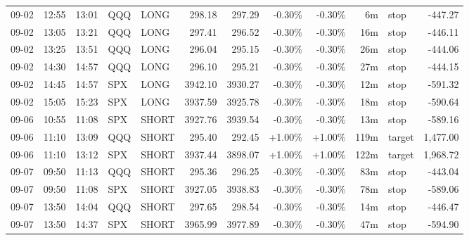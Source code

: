 \documentclass[11pt,a4paper,twoside]{article}
\begin{document}
\begin{center}
\begin{longtable}{>{\color{txtmain}}l l l l l r r r r r >{\color{txtmain}}l r}
09-02 & 12:55 & 13:01 & QQQ & LONG & 298.18 & 297.29 & \textcolor{lossred}{-0.30\%} & \textcolor{lossred}{-0.30\%} & 6m & stop & \textcolor{lossred}{-447.27} \\
09-02 & 13:05 & 13:21 & QQQ & LONG & 297.41 & 296.52 & \textcolor{lossred}{-0.30\%} & \textcolor{lossred}{-0.30\%} & 16m & stop & \textcolor{lossred}{-446.11} \\
09-02 & 13:25 & 13:51 & QQQ & LONG & 296.04 & 295.15 & \textcolor{lossred}{-0.30\%} & \textcolor{lossred}{-0.30\%} & 26m & stop & \textcolor{lossred}{-444.06} \\
09-02 & 14:30 & 14:57 & QQQ & LONG & 296.10 & 295.21 & \textcolor{lossred}{-0.30\%} & \textcolor{lossred}{-0.30\%} & 27m & stop & \textcolor{lossred}{-444.15} \\
09-02 & 14:45 & 14:57 & SPX & LONG & 3942.10 & 3930.27 & \textcolor{lossred}{-0.30\%} & \textcolor{lossred}{-0.30\%} & 12m & stop & \textcolor{lossred}{-591.32} \\
09-02 & 15:05 & 15:23 & SPX & LONG & 3937.59 & 3925.78 & \textcolor{lossred}{-0.30\%} & \textcolor{lossred}{-0.30\%} & 18m & stop & \textcolor{lossred}{-590.64} \\
09-06 & 10:55 & 11:08 & SPX & SHORT & 3927.76 & 3939.54 & \textcolor{lossred}{-0.30\%} & \textcolor{lossred}{-0.30\%} & 13m & stop & \textcolor{lossred}{-589.16} \\
09-06 & 11:10 & 13:09 & QQQ & SHORT & 295.40 & 292.45 & \textcolor{wingreen}{+1.00\%} & \textcolor{wingreen}{+1.00\%} & 119m & target & \textcolor{wingreen}{1,477.00} \\
09-06 & 11:10 & 13:12 & SPX & SHORT & 3937.44 & 3898.07 & \textcolor{wingreen}{+1.00\%} & \textcolor{wingreen}{+1.00\%} & 122m & target & \textcolor{wingreen}{1,968.72} \\
09-07 & 09:50 & 11:13 & QQQ & SHORT & 295.36 & 296.25 & \textcolor{lossred}{-0.30\%} & \textcolor{lossred}{-0.30\%} & 83m & stop & \textcolor{lossred}{-443.04} \\
09-07 & 09:50 & 11:08 & SPX & SHORT & 3927.05 & 3938.83 & \textcolor{lossred}{-0.30\%} & \textcolor{lossred}{-0.30\%} & 78m & stop & \textcolor{lossred}{-589.06} \\
09-07 & 13:50 & 14:04 & QQQ & SHORT & 297.65 & 298.54 & \textcolor{lossred}{-0.30\%} & \textcolor{lossred}{-0.30\%} & 14m & stop & \textcolor{lossred}{-446.47} \\
09-07 & 13:50 & 14:37 & SPX & SHORT & 3965.99 & 3977.89 & \textcolor{lossred}{-0.30\%} & \textcolor{lossred}{-0.30\%} & 47m & stop & \textcolor{lossred}{-594.90} \\

\end{longtable}
\end{center}
\end{document}
